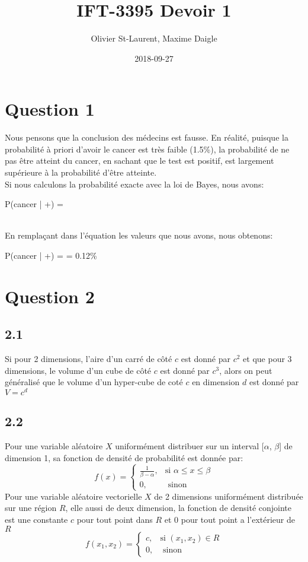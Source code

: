 \documentclass[12pt]{article}
\author{Olivier St-Laurent, Maxime Daigle}
\title{IFT-3395  Devoir 1}
\date{2018-09-27}
\newenvironment{eqs*}{\begin{equation*}\begin{aligned}}{\end{aligned}\end{equation*}}
\begin{document}
\maketitle

\section{Question 1}

Nous pensons que la conclusion des médecins est fausse. En réalité, puisque la probabilité à priori d'avoir le cancer est très faible (1.5\%), la probabilité de ne pas être atteint du cancer, en sachant que le test est positif, est largement supérieure à la probabilité d'être atteinte.
\\[\baselineskip]
Si nous calculons la probabilité exacte avec la loi de Bayes, nous avons:
\begin{eqs*}
P(cancer | +) = 
\end{eqs*}
\\[\baselineskip]
En remplaçant dans l'équation les valeurs que nous avons, nous obtenons:
\begin{eqs*}
P(cancer | +) =  = 0.12\%
\end{eqs*}

\section{Question 2}
\subsection{2.1}
Si pour 2 dimensions, l'aire d'un carré de côté $c$ est donné par $c^2$ et que pour 3 dimensions, le volume d'un cube de côté $c$ est donné par $c^3$, alors
on peut généralisé que le volume d'un hyper-cube de coté $c$ en dimension $d$ est donné par $V = c^d$


\subsection{2.2}

Pour une variable aléatoire $X$ uniformément distribuer sur un interval [$\alpha$, $\beta$] de dimension 1, sa fonction de densité de probabilité est donnée par:
\[
    f(x) =
	\begin{cases}
        \tfrac{1}{\beta -\alpha}, & \text{si $\alpha \leq x \leq \beta$} \\
        0, & \text{ sinon}
	\end{cases}
\]
Pour une variable aléatoire vectorielle $X$ de 2 dimensions uniformément distribuée sur une région $R$, elle aussi de deux dimension, la fonction
de densité conjointe est une constante $c$ pour tout point dans $R$ et 0 pour tout point a l'extérieur de $R$
\[
    f(x_{1}, x_{2}) =
	\begin{cases}
        c, & \text{si $(x_{1}, x_{2}) \in R$}  \\
        0, & \text{ sinon}
	\end{cases}
\]
\end{document}
